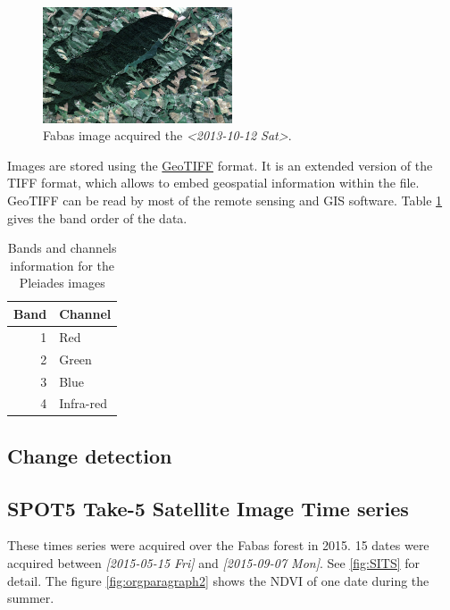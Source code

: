 \documentclass[a4paper,11pt,DIV=18]{scrartcl}
\begin{document}
\begin{figure}[htb]
\centering
\includegraphics[width=0.5\textwidth]{./figures/quicklook_fabas_12_10_2013.jpg}
\caption{\label{fig:orgparagraph1}
Fabas image acquired the \textit{<2013-10-12 Sat>}.}
\end{figure}

Images are stored using the \href{https://trac.osgeo.org/geotiff/}{GeoTIFF} format.  It is an extended version
of  the TIFF  format,  which allows  to  embed geospatial  information
within the file. GeoTIFF can be read by most of the remote sensing and
GIS software. Table \ref{tab:orgtable6} gives the band order of the data.

\begin{table}[htb]
\caption{\label{tab:orgtable6}
Bands and channels information for the Pleiades images}
\centering
\begin{tabular}{rl}
\toprule
Band & Channel\\
\midrule
1 & Red\\
2 & Green\\
3 & Blue\\
4 & Infra-red\\
\bottomrule
\end{tabular}
\end{table}
\subsection{Change detection}
\label{sec:orgheadline11}
\subsection{SPOT5 Take-5 Satellite Image Time series}
\label{sec:orgheadline12}
These times  series were acquired  over the  Fabas forest in  2015. 15
dates were acquired between \textit{[2015-05-15 Fri] } and \textit{[2015-09-07 Mon]}. See
\ref{fig:SITS} for  detail.  The figure  \ref{fig:orgparagraph2} shows the NDVI  of one
date during the summer.
\end{document}
